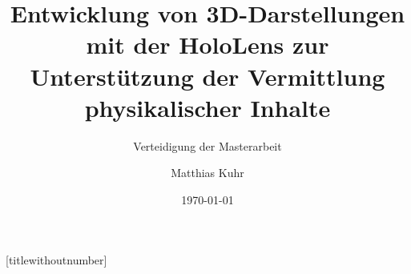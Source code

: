 \documentclass{beamer}
\title{Entwicklung von 3D-Darstellungen mit der HoloLens zur Unterstützung der Vermittlung physikalischer Inhalte}
\subtitle{Verteidigung der Masterarbeit}
\author{Matthias Kuhr}
\date{\today}
\begin{document}
{
	[titlewithoutnumber] %
	\maketitle
	
	\nocite{Zimmer17,Milgram94}
}


%



\end{document}
